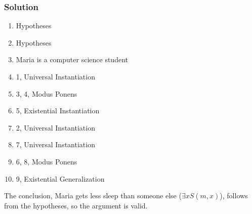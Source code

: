 \documentclass[12pt]{article}
\begin{document}
\subsubsection*{Solution}
\begin{enumerate}[left=0em,labelwidth=4em,align=left]
    \item[\( \forall x (C(x) \rightarrow \exists y W(x, y)) \)] \hfill Hypotheses
    \item[\( \forall x \forall y (W(x, y) \rightarrow S(x, y)) \)] \hfill Hypotheses
    \item[\( C(m) \)] \hfill Maria is a computer science student
    \item[\( C(m) \rightarrow \exists y W(m, y) \)] \hfill 1, Universal Instantiation
    \item[\( \exists y W(m, y) \)] \hfill 3, 4, Modus Ponens
    \item[\( W(m, a) \)] \hfill 5, Existential Instantiation
    \item[\( \forall y (W(m, y) \rightarrow S(m, y)) \)] \hfill 2, Universal Instantiation
    \item[\( W(m, a) \rightarrow S(m, a) \)] \hfill 7, Universal Instantiation
    \item[\( S(m, a) \)] \hfill 6, 8, Modus Ponens
    \item[\( \exists x S(m, x) \)] \hfill 9, Existential Generalization
\end{enumerate}

The conclusion, Maria gets less sleep than someone else (\( \exists x S(m, x) \)), follows from the hypotheses, so the argument is valid.
\end{document}
